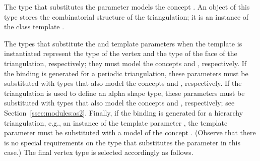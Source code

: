 The type that substitutes the 
parameter models the concept
. An object of this type
stores the combinatorial structure of the triangulation; it is an
instance of the class template
.

The types that substitute the  and
 template parameters when the template
is instantiated represent the type of the vertex and the type of the
face of the triangulation, respectively; they must model the concepts
 and
, respectively. If the
binding is generated for a periodic triangulation, these parameters
must be substituted with types that also model the concepts
 and
, respectively.
If the triangulation is used to define an alpha shape type, these
parameters must be substituted with types that also model the concepts
 and
, respectively; see
Section~\ref{ssec:modules:as2}. Finally, if the binding is generated
for a hierarchy triangulation, e.g., an instance of the template
parameter
, the
 template parameter must be substituted with
a model of the concept
. (Observe that
there is no special requirements on the type that substitutes the
 parameter in this case.) The final vertex
type is selected accordingly as follows.

